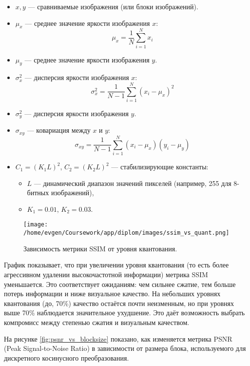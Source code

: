 \begin{itemize}
    \item $x, y$ — сравниваемые изображения (или блоки изображений).
    \item $\mu_x$ — среднее значение яркости изображения $x$:
    \[
        \mu_x = \frac{1}{N} \sum_{i=1}^{N} x_i
    \]
    \item $\mu_y$ — среднее значение яркости изображения $y$.
    
    \item $\sigma_x^2$ — дисперсия яркости изображения $x$:
    \[
        \sigma_x^2 = \frac{1}{N-1} \sum_{i=1}^{N} (x_i - \mu_x)^2
    \]
    \item $\sigma_y^2$ — дисперсия яркости изображения $y$.
    
    \item $\sigma_{xy}$ — ковариация между $x$ и $y$:
    \[
        \sigma_{xy} = \frac{1}{N-1} \sum_{i=1}^{N} (x_i - \mu_x)(y_i - \mu_y)
    \]
    
    \item $C_1 = (K_1 L)^2$, $C_2 = (K_2 L)^2$ — стабилизирующие константы:
    \begin{itemize}
        \item $L$ — динамический диапазон значений пикселей (например, 255 для 8-битных изображений),
        \item $K_1 = 0.01$, $K_2 = 0.03$.
    \end{itemize}
\end{itemize}



\begin{figure}[H]
    \centering
    \texttt{[image: /home/evgen/Coursework/app/diplom/images/ssim\_vs\_quant.png]}
    \caption{Зависимость метрики SSIM от уровня квантования.}
    \label{fig:ssim_vs_quant}
\end{figure}

График показывает, что при увеличении уровня квантования 
(то есть более агрессивном удалении высокочастотной информации) метрика SSIM уменьшается. 
Это соответствует ожиданиям: чем сильнее сжатие, тем больше потерь информации и ниже визуальное качество. 
На небольших уровнях квантования (до, 70\%) качество остаётся почти неизменным, но при уровнях выше 70\% наблюдается значительное ухудшение. 
Это даёт возможность выбрать компромисс между степенью сжатия и визуальным качеством.


\clearpage
На рисунке \ref{fig:psnr_vs_blocksize} показано, как изменяется метрика PSNR (Peak Signal-to-Noise Ratio) в зависимости от размера блока, 
используемого для дискретного косинусного преобразования.

